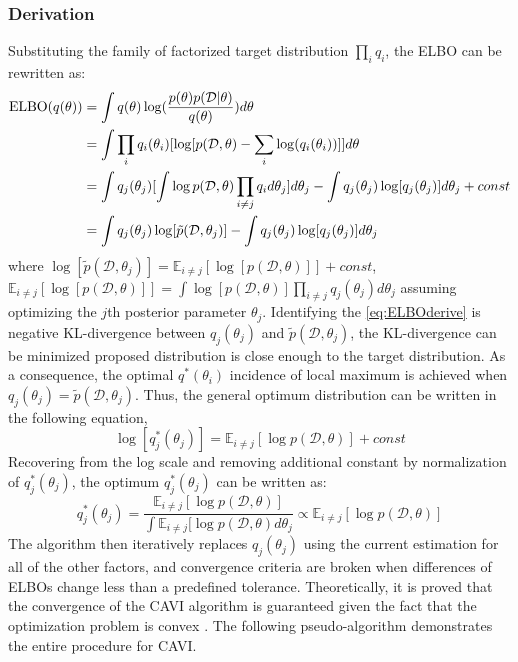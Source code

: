 \subsubsection{Derivation}
Substituting the family of factorized target distribution $\prod_i q_i$, the ELBO can be rewritten as:
\begin{equation}
	\label{eq:ELBOderive}	
	\begin{aligned}
		\textnormal{ELBO}(q(\theta)) &= \int q(\theta)\log(\frac{p(\theta)p(\mathcal{D}|\theta)}{q(\theta)})d\theta \\
		&= \int \prod_i q_i(\theta_i) [\log[p(\mathcal{D},\theta) - \sum_i \log(q_i(\theta_i))]]d\theta \\
		&= \int q_j(\theta_j)[\int \log p(\mathcal{D},\theta) \prod_{i\neq j}q_i d\theta_j]d\theta_j - \int q_j(\theta_j) \log[q_j(\theta_j)]d\theta_j + const\\
		&= \int q_j(\theta_j) \log[\tilde{p}(\mathcal{D},\theta_j)] - \int q_j(\theta_j) \log[q_j(\theta_j)]d\theta_j
	\end{aligned}
\end{equation}
where $\log[\tilde{p}(\mathcal{D},\theta_j)] = \mathbb{E}_{i \neq j}[\log[p(\mathcal{D},\theta)]] + const$,\\ $\mathbb{E}_{i\neq j}[\log[p(\mathcal{D},\theta)]] = \int \log[p(\mathcal{D},\theta)]\prod_{i\neq j}q_j(\theta_j)d\theta_j$ assuming optimizing the $j$th posterior parameter $\theta_j$.
Identifying the \ref{eq:ELBOderive} is negative KL-divergence between $q_j(\theta_j) $ and $\tilde{p}(\mathcal{D},\theta_j)$, the KL-divergence can be minimized proposed distribution is close enough to the target distribution. As a consequence, the optimal $q^{*}(\theta_i)$ incidence of local maximum is achieved when $q_j(\theta_j) = \tilde{p}(\mathcal{D},\theta_j)$. Thus, the general optimum distribution can be written in the following equation,
\begin{equation}
	\label{eq:logoptimumQ}
	\log[q_j^*(\theta_j)] = \mathbb{E}_{i\neq j}[\log p(\mathcal{D},\theta)] + const
\end{equation}
Recovering from the log scale and removing additional constant by normalization of $q_j^*(\theta_j)$, the optimum $q_j^*(\theta_j)$ can be written as:
\begin{equation}
	\label{eq:optimalSolution}
	q_j^*(\theta_j) = \frac{\mathbb{E}_{i\neq j}[\log p(\mathcal{D},\theta)]}{\int \mathbb{E}_{i\neq j}[\log p(\mathcal{D},\theta)d\theta_j} \propto \mathbb{E}_{i\neq j}[\log p(\mathcal{D},\theta)]
\end{equation}
The algorithm then iteratively replaces $q_j(\theta_j)$ using the current estimation for all of the other factors, and convergence criteria are broken when differences of ELBOs change less than a predefined tolerance. Theoretically, it is proved that the convergence of the CAVI algorithm is guaranteed given the fact that the optimization problem is convex \cite{boyd2004convex}. The following pseudo-algorithm demonstrates the entire procedure for CAVI.

